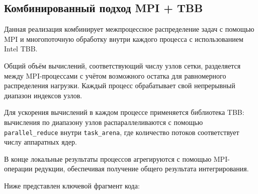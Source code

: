 \documentclass[a4paper,14pt]{article}
\begin{document}
\subsection{Комбинированный подход MPI + TBB}

Данная реализация комбинирует межпроцессное распределение задач с помощью MPI и многопоточную обработку внутри каждого процесса с использованием Intel TBB.

Общий объём вычислений, соответствующий числу узлов сетки, разделяется между MPI-процессами с учётом возможного остатка для равномерного распределения нагрузки. Каждый процесс обрабатывает свой непрерывный диапазон индексов узлов.

Для ускорения вычислений в каждом процессе применяется библиотека TBB: вычисления по диапазону узлов распараллеливаются с помощью \texttt{parallel\_reduce} внутри \texttt{task\_arena}, где количество потоков соответствует числу аппаратных ядер.

В конце локальные результаты процессов агрегируются с помощью MPI-операции редукции, обеспечивая получение общего результата интегрирования.

Ниже представлен ключевой фрагмент кода:
\end{document}
